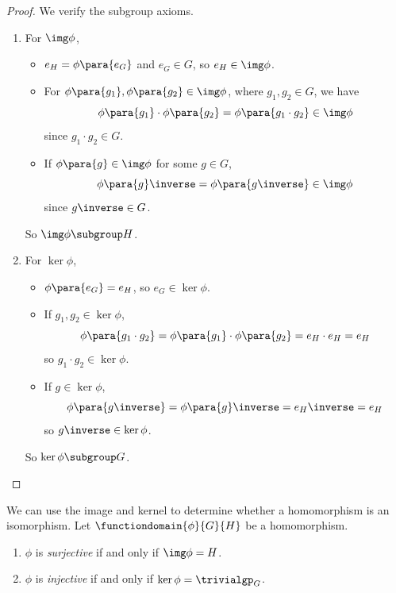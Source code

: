 \begin{proof}
    We verify the subgroup axioms.

    \begin{enumerate}
        \item For \(\img \phi\),
        \begin{itemize}
            \item \(e_H = \phi\para{e_G}\) and \(e_G \in G\), so \(e_H \in \img \phi\).
            \item For \(\phi\para{g_1}, \phi\para{g_2} \in \img \phi\), where \(g_1, g_2 \in G\), we have
            \[
                \phi\para{g_1} \cdot \phi\para{g_2} = \phi\para{g_1 \cdot g_2} \in \img \phi
            \]
            since \(g_1 \cdot g_2 \in G\).
            \item If \(\phi \para{g} \in \img \phi\) for some \(g \in G\),
            \[
                \phi\para{g}\inverse = \phi\para{g\inverse} \in \img \phi
            \]
            since \(g\inverse \in G\).
        \end{itemize}

        So \(\img \phi \subgroup H\).
        
        \item For \(\ker \phi\),
        \begin{itemize}
            \item \(\phi\para{e_G} = e_H\), so \(e_G \in \ker \phi\).
            \item If \(g_1, g_2 \in \ker \phi\),
            \[
                \phi\para{g_1 \cdot g_2} = \phi\para{g_1} \cdot \phi\para{g_2} = e_H \cdot e_H = e_H
            \]
            so \(g_1 \cdot g_2 \in \ker \phi\).
            \item If \(g \in \ker \phi\),
            \[
                \phi\para{g\inverse} = \phi\para{g}\inverse = e_H\inverse = e_H
            \]
            so \(g \inverse \in \ker \phi\).
        \end{itemize}

        So \(\ker \phi \subgroup G\).
    \end{enumerate}
\end{proof}

\begin{remarks}
    We can use the image and kernel to determine whether a homomorphism is an isomorphism. Let \(\functiondomain{\phi}{G}{H}\) be a homomorphism.
    \begin{enumerate}
        \item \(\phi\) is \emph{surjective} if and only if \(\img \phi = H\).
        \item \(\phi\) is \emph{injective} if and only if \(\ker \phi = \trivialgp_{G}\).
    \end{enumerate}
\end{remarks}

